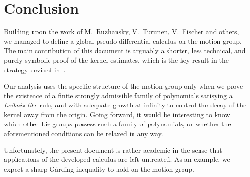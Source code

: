 \chapter{Conclusion}

Building upon the work of M.~Ruzhansky, V.~Turunen, V.~Fischer and others,
we managed to define a global pseudo-differential calculus on the motion group.
The main contribution of this document is arguably a shorter, less technical, and purely symbolic proof of the kernel estimates,
which is the key result in the strategy devised in~\cite{FischerRuzhansky16}.

Our analysis uses the specific structure of the motion group
only when we prove the existence of a finite strongly admissible family of polynomials satisying a \emph{Leibniz-like} rule,
and with adequate growth at infinity to control the decay of the kernel away from the origin.
Going forward,
it would be interesting to know which other Lie groups possess such a family of polynomials,
or whether the aforementioned conditions can be relaxed in any way.

Unfortunately,
the present document is rather academic
in the sense that applications of the developed calculus are left untreated.
As an example,
we expect a sharp Gårding inequality to hold on the motion group.
